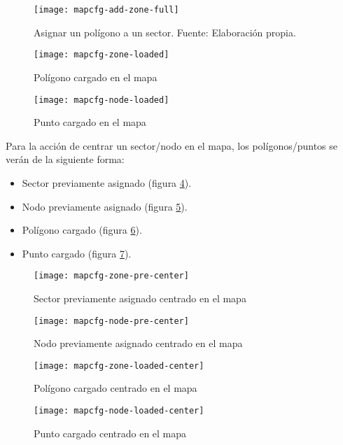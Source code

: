 \begin{figure}[H]
	\centering
	\texttt{[image: mapcfg-add-zone-full]}
	\caption{\label{fig:mapcfg-add-zone-full} Asignar un polígono a un sector. Fuente: Elaboración propia.}
\end{figure}

\begin{figure}[H]
	\centering
	\texttt{[image: mapcfg-zone-loaded]}
	\caption{\label{fig:mapcfg-zone-loaded} Polígono cargado en el mapa}
\end{figure}

\begin{figure}[H]
	\centering
	\texttt{[image: mapcfg-node-loaded]}
	\caption{\label{fig:mapcfg-node-loaded} Punto cargado en el mapa}
\end{figure}

Para la acción de centrar un sector/nodo en el mapa, los polígonos/puntos se verán de la siguiente forma:
\begin{itemize}
    \item Sector previamente asignado (figura \ref{fig:mapcfg-zone-pre-center}).
    \item Nodo previamente asignado (figura \ref{fig:mapcfg-node-pre-center}).
    \item Polígono cargado (figura \ref{fig:mapcfg-zone-loaded-center}).
    \item Punto cargado (figura \ref{fig:mapcfg-node-loaded-center}).
\end{itemize}

\begin{figure}[H]
	\centering
	\texttt{[image: mapcfg-zone-pre-center]}
	\caption{\label{fig:mapcfg-zone-pre-center} Sector previamente asignado centrado en el mapa}
\end{figure}

\begin{figure}[H]
	\centering
	\texttt{[image: mapcfg-node-pre-center]}
	\caption{\label{fig:mapcfg-node-pre-center} Nodo previamente asignado centrado en el mapa}
\end{figure}

\begin{figure}[H]
	\centering
	\texttt{[image: mapcfg-zone-loaded-center]}
	\caption{\label{fig:mapcfg-zone-loaded-center} Polígono cargado centrado en el mapa}
\end{figure}

\begin{figure}[H]
	\centering
	\texttt{[image: mapcfg-node-loaded-center]}
	\caption{\label{fig:mapcfg-node-loaded-center} Punto cargado centrado en el mapa}
\end{figure}

